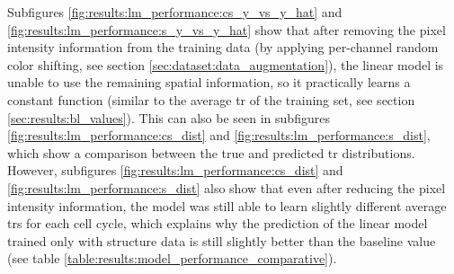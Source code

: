 Subfigures \ref{fig:results:lm_performance:cs_y_vs_y_hat} and \ref{fig:results:lm_performance:s_y_vs_y_hat} show that after removing the pixel intensity information from the training data (by applying per-channel random color shifting, see section \ref{sec:dataset:data_augmentation}), the linear model is unable to use the remaining spatial information, so it practically learns a constant function (similar to the average \gls{tr} of the training set, see section \ref{sec:results:bl_values}).
This can also be seen in subfigures \ref{fig:results:lm_performance:cs_dist} and \ref{fig:results:lm_performance:s_dist}, which show a comparison between the true and predicted \gls{tr} distributions.
However, subfigures \ref{fig:results:lm_performance:cs_dist} and \ref{fig:results:lm_performance:s_dist} also show that even after reducing the pixel intensity information, the model was still able to learn slightly different average \glspl{tr} for each cell cycle, which explains why the prediction of the linear model trained only with structure data is still slightly better than the baseline value (see table \ref{table:results:model_performance_comparative}).
